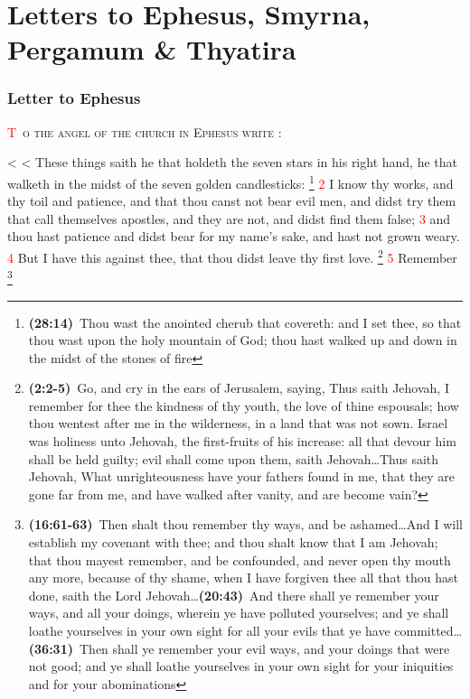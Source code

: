 \documentclass[12pt,twoside]{memoir}
\makeatletter
\newcommand{\cbibleref}[3]{\textbf{\ibibleverse{#1}(#2)}\ {#3}}
\newcommand{\cbiblechvs}[3]{\textbf{\ibiblechvs{#1}(#2)}\ {#3}}
\newcommand{\cbiblefoot}[3]{\footnote{\cbibleref{#1}{#2}{#3}}}
\newcommand{\cbiblefoottriosb}[7]{\footnote{\cbibleref{#1}{#2}{#3}\ldots \cbiblechvs{#1}{#4}{#5}\ldots \cbiblechvs{#1}{#6}{#7}}}
\newcommand{\vnum}[1]{\textcolor{red}{\normalsize{#1}}}
\def\zz{%
\ifnum\prevgraf<\c@L@lines
\zzc\z@
\loop
\ifnum\zzc<\prevgraf
\advance\zzc\@ne
\afterassignment\zzda\count@\L@parshape\relax
\repeat
\parshape\L@parshape
\fi}
\def\zzda{\afterassignment\zzdb\dimen@}
\def\zzdb{\afterassignment\zzdef\dimen@}
\def\zzdef#1\relax{\edef\L@parshape{\the\numexpr\count@-1\relax\space #1}}
\makeatother
\begin{document}
\chapter{Letters to Ephesus, Smyrna, \newline Pergamum \& Thyatira}
\subsection*{Letter to Ephesus}
\lettrine[lines=3]{\textcolor{red}{T}}{\ o the angel of the church in Ephesus write} :

\zz These things saith he that holdeth the seven stars in his right hand, he that walketh in the midst of the seven golden candlesticks:%
	\cbiblefoot{Ezekiel}{28:14}{Thou wast the anointed cherub that covereth: and I set thee, so that thou wast upon the holy mountain of God; thou hast walked up and down in the midst of the stones of fire}
\vnum{2} I know thy works, and thy toil and patience, and that thou canst not bear evil men, and didst try them that call themselves apostles, and they are not, and didst find them false; %
\vnum{3} and thou hast patience and didst bear for my name’s sake, and hast not grown weary. %
\vnum{4} But I have this against thee, that thou didst leave thy first love.%
	\cbiblefoot{Jeremiah}{2:2-5}{Go, and cry in the ears of Jerusalem, saying, Thus saith Jehovah, I remember for thee the kindness of thy youth, the love of thine espousals; how thou wentest after me in the wilderness, in a land that was not sown. Israel was holiness unto Jehovah, the first-fruits of his increase: all that devour him shall be held guilty; evil shall come upon them, saith Jehovah\ldots Thus saith Jehovah, What unrighteousness have your fathers found in me, that they are gone far from me, and have walked after vanity, and are become vain?}
\vnum{5} Remember%
	\cbiblefoottriosb{Ezekiel}{16:61-63}{Then shalt thou remember thy ways, and be ashamed\ldots And I will establish my covenant with thee; and thou shalt know that I am Jehovah; that thou mayest remember, and be confounded, and never open thy mouth any more, because of thy shame, when I have forgiven thee all that thou hast done, saith the Lord Jehovah}%
				{20:43}{And there shall ye remember your ways, and all your doings, wherein ye have polluted yourselves; and ye shall loathe yourselves in your own sight for all your evils that ye have committed}%
				{36:31}{Then shall ye remember your evil ways, and your doings that were not good; and ye shall loathe yourselves in your own sight for your iniquities and for your abominations}%
\end{document}
